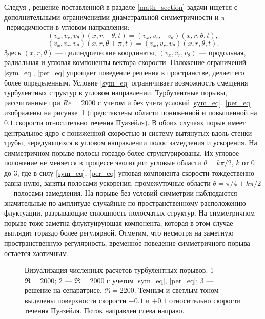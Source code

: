 Следуя \cite{Avila2013}, решение поставленной в разделе \ref{math_section} задачи ищется с дополнительными ограничениями диаметральной симметричности и $\pi$-периодичности в угловом направлении:
\begin{equation}\label{sym_eq}
(v_x, v_r, v_\theta)(x, r, -\theta, t) = (v_x, v_r, -v_\theta)(x, r, \theta, t),
\end{equation}
\begin{equation}\label{per_eq}
(v_x, v_r, v_\theta)(x, r, \theta+\pi, t) = (v_x, v_r, v_\theta)(x, r, \theta, t).
\end{equation}
Здесь $(x, r, \theta)$ --- цилиндрические координаты, $(v_x, v_r, v_\theta)$ --- продольная, радиальная и угловая компоненты вектора скорости. Наложение ограничений \eqref{sym_eq}, \eqref{per_eq} упрощает поведение решения в пространстве, делает его более определенным. Условие \eqref{sym_eq} ограничивает возможность смещения турбулентных структур в угловом направлении.  Турбулентные порывы, рассчитанные при $Re=2000$ с учетом и без учета условий \eqref{sym_eq}, \eqref{per_eq} изображены на рисунке~\ref{3D_img} (представлены области пониженной и повышенной на $0.1$ скорости относительно течения Пуазейля). В обоих случаях порыв имеет центральное ядро с пониженной скоростью и систему вытянутых вдоль стенки трубы, чередующихся в угловом направлении полос замедления и ускорения. На симметричном порыве полосы гораздо более структурированы. Их угловое положение не меняется в процессе эволюции: угловые области $\theta=k\pi/2$, $k$ от $0$ до $3$, где в силу \eqref{sym_eq}, \eqref{per_eq} угловая компонента скорости тождественно равна нулю, заняты полосами ускорения, промежуточные области $\theta=\pi/4+k\pi/2$ --- полосами замедления. На порыве без условий симметрии наблюдаются значительные по амплитуде случайные по пространственному расположению флуктуации, разрывающие сплошность полосчатых структур. На симметричном порыве тоже заметна флуктуирующая компонента, которая в этом случае выглядит гораздо более регулярной. Отметим, что несмотря на заметную пространственную регулярность, временн\'{о}е поведение симметричного порыва остается хаотичным.


\begin{figure}[h]
\caption{Визуализация численных расчетов турбулентных порывов: 1 --- $\Re = 2000$; 2 --- $\Re = 2000$ с учетом \eqref{sym_eq}, \eqref{per_eq}; 3 --- решение на сепаратрисе, $\Re = 2200$. Темным и светлым тоном выделены поверхности скорости $-0.1$ и $+0.1$ относительно скорости течения Пуазейля. Поток направлен слева направо.}
\label{3D_img}
\end{figure}

